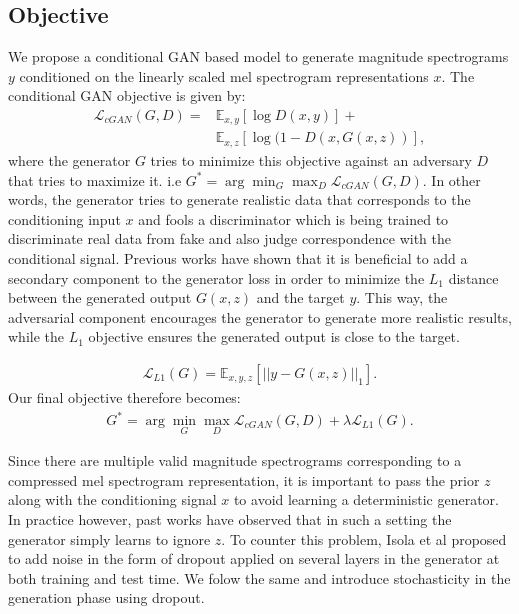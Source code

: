 \documentclass[a4paper]{article}
\begin{document}
\subsection{Objective}
We propose a conditional GAN based model to generate magnitude spectrograms $y$ conditioned on the linearly scaled mel spectrogram representations $x$. The conditional GAN objective is given by:
\begin{align}
    \mathcal{L}_{cGAN}(G,D) = &\mathbb{E}_{x,y}[\log D(x,y)] + \nonumber \\
                 &\mathbb{E}_{x,z}[\log (1-D(x,G(x,z))],\label{cGAN_equation}
\end{align}
where the generator $G$ tries to minimize this objective against an adversary $D$ that tries to maximize it. i.e $G^*  = \arg\min_G \max_D \mathcal{L}_{cGAN}(G,D)$. In other words, the generator tries to generate realistic data that corresponds to the conditioning input $x$ and fools a discriminator which is being trained to discriminate real data from fake and also judge correspondence with the conditional signal. Previous works have shown that it is beneficial to add a secondary component to the generator loss in order to minimize the $L_1$ distance between the generated output $G(x,z)$ and the target $y$. This way, the adversarial component encourages the generator to generate more realistic results,  while the $L_1$ objective ensures the generated output is close to the target.

\begin{align}
    \mathcal{L}_{L1}(G) = \mathbb{E}_{x,y,z}[{||y-G(x,z)||}_1].\label{L1_equation}
\end{align}
Our final objective therefore becomes:
\begin{align}
    G^*  = \arg\min_G\max_D \mathcal{L}_{cGAN}(G,D) + \lambda \mathcal{L}_{L1}(G).\label{full_objective}
\end{align}

Since there are multiple valid magnitude spectrograms corresponding to a compressed mel spectrogram representation, it is important to pass the prior $z$ along with the conditioning signal $x$ to avoid learning a deterministic generator. In practice however, past works \cite{Mathieu2016DeepMV,pix2pix} have observed that in such a setting the generator simply learns to ignore $z$. To counter this problem, Isola et al \cite{pix2pix} proposed to add noise in the form of dropout applied on several layers in the generator at both training and test time. We folow the same and introduce stochasticity in the generation phase using dropout.
\end{document}
